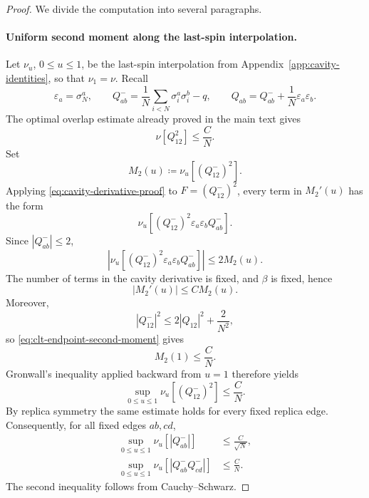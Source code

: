 \begin{proof}
We divide the computation into several paragraphs.

\paragraph{Uniform second moment along the last-spin interpolation.}
Let $\nu_u$, $0\le u\le1$, be the last-spin interpolation from
Appendix~\ref{app:cavity-identities}, so that $\nu_1=\nu$.  Recall
\[
 \varepsilon_a=\sigma_N^a,
 \qquad
 Q^-_{ab}=\frac1N\sum_{i<N}\sigma_i^a\sigma_i^b-q,
 \qquad
 Q_{ab}=Q^-_{ab}+\frac1N\varepsilon_a\varepsilon_b.
\]
The optimal overlap estimate already proved in the main text gives
\begin{equation}
 \nu[Q_{12}^2]\le\frac{C}{N}.
 \label{eq:clt-endpoint-second-moment}
\end{equation}
Set
\[
 M_2(u)\coloneqq\nu_u[(Q^-_{12})^2].
\]
Applying \eqref{eq:cavity-derivative-proof} to
$F=(Q^-_{12})^2$, every term in $M_2'(u)$ has the form
\[
 \nu_u\!\left[
 (Q^-_{12})^2
 \varepsilon_a\varepsilon_bQ^-_{ab}
 \right].
\]
Since $|Q^-_{ab}|\le2$,
\[
 \left|
 \nu_u\!\left[
 (Q^-_{12})^2
 \varepsilon_a\varepsilon_bQ^-_{ab}
 \right]
 \right|
 \le2M_2(u).
\]
The number of terms in the cavity derivative is fixed, and $\beta$ is fixed,
hence
\begin{equation}
 |M_2'(u)|\le C M_2(u).
 \label{eq:clt-M2-differential}
\end{equation}
Moreover,
\[
 |Q^-_{12}|^2
 \le
 2|Q_{12}|^2+\frac2{N^2},
\]
so \eqref{eq:clt-endpoint-second-moment} gives
\[
 M_2(1)\le\frac{C}{N}.
\]
Gronwall's inequality applied backward from $u=1$ therefore yields
\begin{equation}
 \sup_{0\le u\le1}
 \nu_u[(Q^-_{12})^2]
 \le\frac{C}{N}.
 \label{eq:clt-uniform-cavity-second}
\end{equation}
By replica symmetry the same estimate holds for every fixed replica edge.
Consequently, for all fixed edges $ab,cd$,
\begin{align}
 \sup_{0\le u\le1}\nu_u[|Q^-_{ab}|]
 &\le\frac{C}{\sqrt N},
 \label{eq:clt-cavity-first}\\
 \sup_{0\le u\le1}
 \nu_u[|Q^-_{ab}Q^-_{cd}|]
 &\le\frac{C}{N}.
 \label{eq:clt-cavity-product}
\end{align}
The second inequality follows from Cauchy--Schwarz.


\end{proof}
